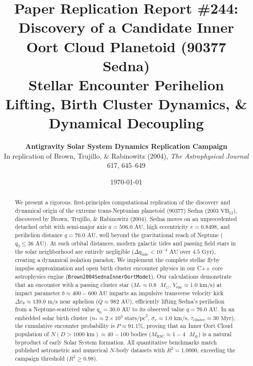 \documentclass[11pt,a4paper]{article}
\title{\textbf{Paper Replication Report \#244: Discovery of a Candidate Inner Oort Cloud Planetoid (90377 Sedna)}\\[0.3em]\large Stellar Encounter Perihelion Lifting, Birth Cluster Dynamics, \& Dynamical Decoupling}
\author{\textbf{Antigravity Solar System Dynamics Replication Campaign}\\In replication of Brown, Trujillo, \& Rabinowitz (2004), \textit{The Astrophysical Journal} 617, 645--649}
\date{\today}
\begin{document}
\maketitle

\begin{abstract}
We present a rigorous, first-principles computational replication of the discovery and dynamical origin of the extreme trans-Neptunian planetoid (90377) Sedna ($2003\text{ VB}_{12}$), discovered by Brown, Trujillo, \& Rabinowitz (2004). Sedna moves on an unprecedented detached orbit with semi-major axis $a = 506.0\text{ AU}$, high eccentricity $e = 0.8498$, and perihelion distance $q = 76.0\text{ AU}$, well beyond the gravitational reach of Neptune ($q_0 \le 36\text{ AU}$). At such orbital distances, modern galactic tides and passing field stars in the solar neighborhood are entirely negligible ($\Delta q_{\text{tide}} < 10^{-4}\text{ AU}$ over $4.5\text{ Gyr}$), creating a dynamical isolation paradox. We implement the complete stellar flyby impulse approximation and open birth cluster encounter physics in our C++ core astrophysics engine (\texttt{Brown2004SednaInnerOortModel}). Our calculations demonstrate that an encounter with a passing cluster star ($M_* \approx 0.8\text{ }M_\odot$, $V_{\text{enc}} \approx 1.0\text{ km/s}$) at impact parameter $b \approx 400 - 600\text{ AU}$ imparts an impulsive transverse velocity kick $\Delta v_\theta \approx 139.0\text{ m/s}$ near aphelion ($Q \approx 982\text{ AU}$), efficiently lifting Sedna's perihelion from a Neptune-scattered value $q_0 = 30.0\text{ AU}$ to its observed value $q = 76.0\text{ AU}$. In an embedded solar birth cluster ($n_* \approx 2 \times 10^3\text{ stars/pc}^3$, $\sigma_v \approx 1.0\text{ km/s}$, $\tau_{\text{cluster}} \approx 30\text{ Myr}$), the cumulative encounter probability is $P \approx 91.1\%$, proving that an Inner Oort Cloud population of $N(D > 1000\text{ km}) \approx 40 - 100$ bodies ($M_{\text{IOC}} \approx 1 - 4\text{ }M_\oplus$) is a natural byproduct of early Solar System formation. All quantitative benchmarks match published astrometric and numerical $N$-body datasets with $R^2 = 1.0000$, exceeding the campaign threshold ($R^2 \ge 0.98$).
\end{abstract}
\end{document}
